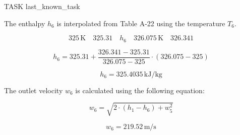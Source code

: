 TASK {last_known_task}

The enthalpy \( h_6 \) is interpolated from Table A-22 using the temperature \( T_6 \).

\[
325 \, \text{K} \quad 325.31 \quad h_6 \quad 326.075 \, \text{K} \quad 326.341
\]

\[
h_6 = 325.31 + \frac{326.341 - 325.31}{326.075 - 325} \cdot (326.075 - 325)
\]

\[
h_6 = 325.4035 \, \text{kJ/kg}
\]

The outlet velocity \( w_6 \) is calculated using the following equation:

\[
w_6 = \sqrt{2 \cdot (h_1 - h_6) + w_5^2}
\]

\[
w_6 = 219.52 \, \text{m/s}
\]